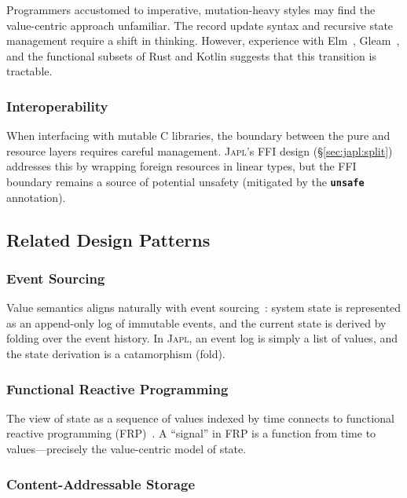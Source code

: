 \documentclass[11pt]{article}
\theoremstyle{definition}
\theoremstyle{remark}
\newcommand{\japl}{\textsc{Japl}}
\newcommand{\keyword}[1]{\texttt{\textbf{#1}}}
\begin{document}
Programmers accustomed to imperative, mutation-heavy styles may find
the value-centric approach unfamiliar.  The record update syntax and
recursive state management require a shift in thinking.  However,
experience with Elm~\cite{czaplicki2012elm}, Gleam~\cite{gleam2024},
and the functional subsets of Rust and Kotlin suggests that this
transition is tractable.

\subsubsection{Interoperability}

When interfacing with mutable C libraries, the boundary between the
pure and resource layers requires careful management.  \japl{}'s FFI
design (\S\ref{sec:japl:split}) addresses this by wrapping foreign
resources in linear types, but the FFI boundary remains a source of
potential unsafety (mitigated by the \keyword{unsafe} annotation).

\subsection{Related Design Patterns}

\subsubsection{Event Sourcing}

Value semantics aligns naturally with event sourcing~\cite{fowler2005event}:
system state is represented as an append-only log of immutable events,
and the current state is derived by folding over the event history.
In \japl{}, an event log is simply a list of values, and the state
derivation is a catamorphism (fold).

\subsubsection{Functional Reactive Programming}

The view of state as a sequence of values indexed by time connects
to functional reactive programming
(FRP)~\cite{elliott1997functional,czaplicki2012elm}.  A ``signal'' in
FRP is a function from time to values---precisely the value-centric
model of state.

\subsubsection{Content-Addressable Storage}
\end{document}

